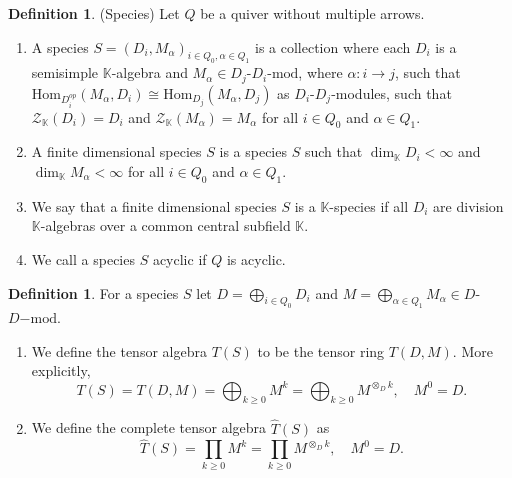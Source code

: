 \documentclass[a4paper, reqno]{amsart}
\theoremstyle{definition}
\newtheorem{mydef}[mythm]{Definition}
\newcommand{\K}{\mathbb{K}}
\begin{document}
\begin{mydef}\label{Definition - Species}(Species)
	Let $Q$ be a quiver without multiple arrows.
	\begin{enumerate}
		\item A species $S=(D_i, M_\alpha)_{i\in Q_0, \alpha\in Q_1}$ is a collection where each $D_i$ is a semisimple $\K$-algebra and $M_\alpha\in D_j$-$D_i$-$\mathrm{mod}$, where $\alpha:i\rightarrow j$, such that $\mathrm{Hom}_{D_i^{op}}(M_\alpha, D_i)\cong \mathrm{Hom}_{D_j}(M_\alpha, D_j)$ as $D_i$-$D_j$-modules, such that $\mathcal{Z}_\K(D_i) = D_i$ and $\mathcal{Z}_\K(M_\alpha) = M_\alpha$ for all $i\in Q_0$ and $\alpha\in Q_1$.
		\item A finite dimensional species $S$ is a species $S$ such that $\dim_\K D_i<\infty$ and $\dim_\K M_\alpha<\infty$ for all $i\in Q_0$ and $\alpha\in Q_1$.
		\item We say that a finite dimensional species $S$ is a $\mathbb{K}$-species if all $D_i$ are division $\K$-algebras over a common central subfield $\mathbb{K}$.
		\item We call a species $S$ acyclic if $Q$ is acyclic.
	\end{enumerate}
\end{mydef}

\begin{mydef}
	For a species $S$ let $D=\bigoplus_{i\in Q_0}D_i$ and $M=\bigoplus_{\alpha\in Q_1}M_\alpha\in D$-$D\mathrm{-mod}$. 
	\begin{enumerate}
		\item We define the tensor algebra $T(S)$ to be the tensor ring $T(D, M)$. More explicitly,
		\begin{equation*}
			T(S) = T(D, M) = \bigoplus_{k\ge 0} M^k = \bigoplus_{k\ge 0} M^{\otimes_D k}, \quad M^0 = D.
		\end{equation*}
		\item We define the complete tensor algebra $\widehat{T}(S)$ as
		\begin{equation*}
			\widehat{T}(S) = \prod_{k\ge 0} M^k = \prod_{k\ge 0} M^{\otimes_D k}, \quad M^0 = D.
		\end{equation*}
	\end{enumerate}
\end{mydef}
\end{document}

